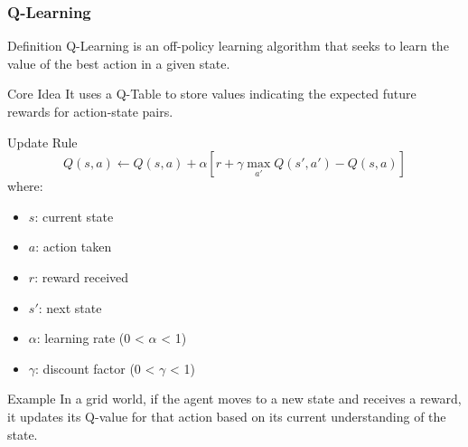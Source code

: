 \documentclass[aspectratio=169]{beamer}
\begin{document}
\begin{frame}[fragile]
    \frametitle{Q-Learning}
    \begin{block}{Definition}
        Q-Learning is an off-policy learning algorithm that seeks to learn the value of the best action in a given state.
    \end{block}
    
    \begin{block}{Core Idea}
        It uses a Q-Table to store values indicating the expected future rewards for action-state pairs.
    \end{block}
    
    \begin{block}{Update Rule}
        \begin{equation}
            Q(s, a) \leftarrow Q(s, a) + \alpha \left[r + \gamma \max_{a'} Q(s', a') - Q(s, a)\right]
        \end{equation}
        where: 
        \begin{itemize}
            \item \(s\): current state
            \item \(a\): action taken
            \item \(r\): reward received
            \item \(s'\): next state
            \item \(\alpha\): learning rate (0 < \(\alpha\) < 1)
            \item \(\gamma\): discount factor (0 < \(\gamma\) < 1)
        \end{itemize}
    \end{block}
    
    \begin{block}{Example}
        In a grid world, if the agent moves to a new state and receives a reward, it updates its Q-value for that action based on its current understanding of the state.
    \end{block}
\end{frame}
\end{document}
